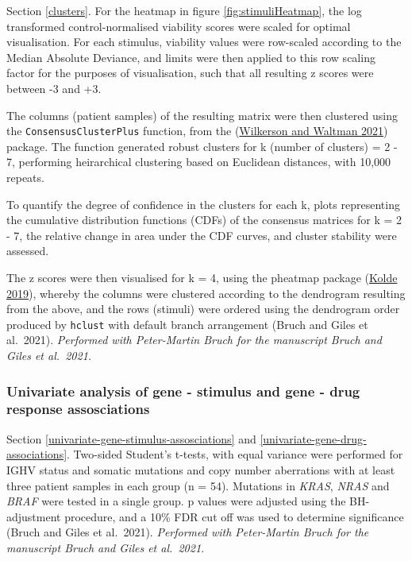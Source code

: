 \documentclass[11pt, a4paper, twosided]{book}
\begin{document}
Section \ref{clusters}. For the heatmap in figure \ref{fig:stimuliHeatmap}, the log transformed control-normalised viability scores were scaled for optimal visualisation. For each stimulus, viability values were row-scaled according to the Median Absolute Deviance, and limits were then applied to this row scaling factor for the purposes of visualisation, such that all resulting z scores were between -3 and +3.

The columns (patient samples) of the resulting matrix were then clustered using the \texttt{ConsensusClusterPlus} function, from the (\protect\hyperlink{ref-R-ConsensusClusterPlus}{Wilkerson and Waltman 2021}) package. The function generated robust clusters for k (number of clusters) = 2 - 7, performing heirarchical clustering based on Euclidean distances, with 10,000 repeats.

To quantify the degree of confidence in the clusters for each k, plots representing the cumulative distribution functions (CDFs) of the consensus matrices for k = 2 - 7, the relative change in area under the CDF curves, and cluster stability were assessed.

The z scores were then visualised for k = 4, using the pheatmap package (\protect\hyperlink{ref-R-pheatmap}{Kolde 2019}), whereby the columns were clustered according to the dendrogram resulting from the above, and the rows (stimuli) were ordered using the dendrogram order produced by \texttt{hclust} with default branch arrangement (Bruch and Giles et al.~2021). \emph{Performed with Peter-Martin Bruch for the manuscript Bruch and Giles et al.~2021.}

\hypertarget{univariate-gene-stimulus-associations-method}{%
\subsubsection{Univariate analysis of gene - stimulus and gene - drug response assosciations}\label{univariate-gene-stimulus-associations-method}}

Section \ref{univariate-gene-stimulus-assosciations} and \ref{univariate-gene-drug-associations}. Two-sided Student's t-tests, with equal variance were performed for IGHV status and somatic mutations and copy number aberrations with at least three patient samples in each group (n = 54). Mutations in \emph{KRAS}, \emph{NRAS} and \emph{BRAF} were tested in a single group. p values were adjusted using the BH-adjustment procedure, and a 10\% FDR cut off was used to determine significance (Bruch and Giles et al.~2021). \emph{Performed with Peter-Martin Bruch for the manuscript Bruch and Giles et al.~2021.}
\end{document}
